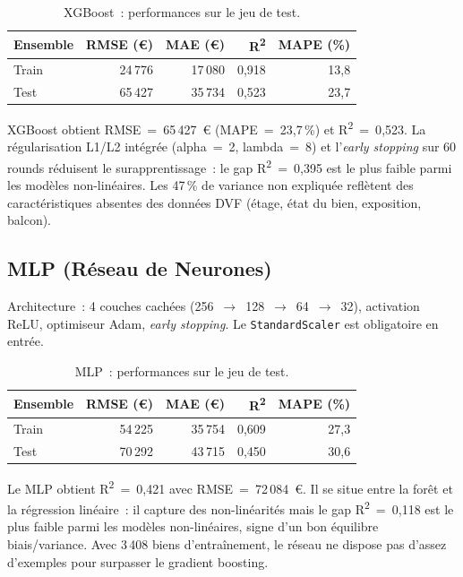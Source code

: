 \documentclass[12pt,a4paper]{article}
\begin{document}
\begin{table}[H]
\centering
\caption{XGBoost~: performances sur le jeu de test.}
\label{tab:xgb}
\begin{tabular}{lrrrr}
\toprule
\textbf{Ensemble} & \textbf{RMSE (\euro)} & \textbf{MAE (\euro)} & \textbf{R\textsuperscript{2}} & \textbf{MAPE (\%)} \\
\midrule
Train & 24\,776 & 17\,080 & 0{,}918 & 13{,}8 \\
Test  & 65\,427 & 35\,734 & 0{,}523 & 23{,}7 \\
\bottomrule
\end{tabular}
\end{table}

\begin{descrbox}
XGBoost obtient RMSE~=~65\,427~\euro{} (MAPE~=~23{,}7\,\%) et R\textsuperscript{2}~=~0{,}523. La r\'egularisation L1/L2 int\'egr\'ee (alpha~=~2, lambda~=~8) et l'\textit{early stopping} sur 60 rounds r\'eduisent le surapprentissage~: le gap R\textsuperscript{2}~=~0{,}395 est le plus faible parmi les mod\`eles non-lin\'eaires. Les 47\,\% de variance non expliqu\'ee refl\`etent des caract\'eristiques absentes des donn\'ees DVF (\'etage, \'etat du bien, exposition, balcon).
\end{descrbox}

\subsection{MLP (R\'eseau de Neurones)}

Architecture~: 4 couches cach\'ees (256~$\to$~128~$\to$~64~$\to$~32), activation ReLU, optimiseur Adam, \textit{early stopping}. Le \texttt{StandardScaler} est obligatoire en entr\'ee.

\begin{table}[H]
\centering
\caption{MLP~: performances sur le jeu de test.}
\label{tab:mlp}
\begin{tabular}{lrrrr}
\toprule
\textbf{Ensemble} & \textbf{RMSE (\euro)} & \textbf{MAE (\euro)} & \textbf{R\textsuperscript{2}} & \textbf{MAPE (\%)} \\
\midrule
Train & 54\,225 & 35\,754 & 0{,}609 & 27{,}3 \\
Test  & 70\,292 & 43\,715 & 0{,}450 & 30{,}6 \\
\bottomrule
\end{tabular}
\end{table}

\begin{descrbox}
Le MLP obtient R\textsuperscript{2}~=~0{,}421 avec RMSE~=~72\,084~\euro. Il se situe entre la for\^et et la r\'egression lin\'eaire~: il capture des non-lin\'earit\'es mais le gap R\textsuperscript{2}~=~0{,}118 est le plus faible parmi les mod\`eles non-lin\'eaires, signe d'un bon \'equilibre biais/variance. Avec 3\,408 biens d'entra\^inement, le r\'eseau ne dispose pas d'assez d'exemples pour surpasser le gradient boosting.
\end{descrbox}
\end{document}
